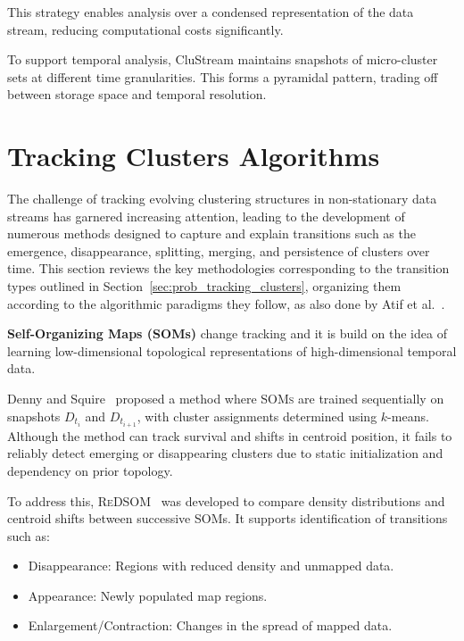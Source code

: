 This strategy enables analysis over a condensed representation of the data
stream, reducing computational costs significantly.

To support temporal analysis, CluStream maintains snapshots of micro-cluster
sets at different time granularities. This forms a pyramidal pattern, trading
off between storage space and temporal resolution.

\section{Tracking Clusters Algorithms}\label{sec:tracking_clusters_algorithms}

The challenge of tracking evolving clustering structures in non-stationary data
streams has garnered increasing attention, leading to the development of
numerous methods designed to capture and explain transitions such as the
emergence, disappearance, splitting, merging, and persistence of clusters over
time. This section reviews the key methodologies corresponding to the
transition types outlined in Section~\ref{sec:prob_tracking_clusters},
organizing them according to the algorithmic paradigms they follow, as also
done by Atif et al.~\cite{tracking_review}.

\textbf{Self-Organizing Maps (SOMs)} change tracking and it is build on the idea of
learning low-dimensional topological representations of high-dimensional temporal data.

Denny and Squire~\cite{som_tracking} proposed a method where \textsc{SOMs} are
trained sequentially on snapshots $D_{t_i}$ and $D_{t_{i+1}}$, with cluster
assignments determined using $k$-means. Although the method can track survival
and shifts in centroid position, it fails to reliably detect emerging or
disappearing clusters due to static initialization and dependency on prior
topology.

To address this, \textsc{ReDSOM}~\cite{redsom_tracking} was developed to
compare density distributions and centroid shifts between successive SOMs. It
supports identification of transitions such as:

\begin{itemize}
    \item Disappearance: Regions with reduced density and unmapped data.

    \item Appearance: Newly populated map regions.

    \item Enlargement/Contraction: Changes in the spread of mapped data.
\end{itemize}

